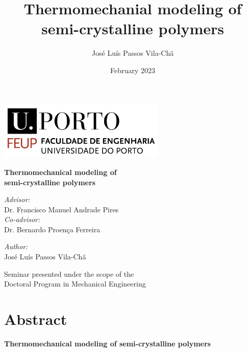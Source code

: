 \documentclass[a4paper, openright, twoside]{report}
\title{Thermomechanial modeling of semi-crystalline polymers}
\author{José Luís Passos Vila-Chã}
\date{February 2023}
\begin{document}
\begin{titlepage}
\thispagestyle{firststyle}
\begin{center}
   \begin{minipage}[c][10cm][l]{0.9\textwidth}

        \includegraphics[width=0.6\textwidth]{figures/university}

        \vspace{3.5cm}
        \huge
       \textbf{Thermomechanical modeling of}\\ \textbf{semi-crystalline polymers}

       \vspace{1.5cm}
        \small
       \textit{Advisor:}\\
       \normalsize
       Dr. Francisco Manuel Andrade Pires 	 	\\
       \small
       \textit{Co-advisor:}\\
       \normalsize
       Dr. Bernardo Proença Ferreira\\

       \vspace{0.3cm}


         \small
        \textit{Author:}\\
        \vspace{0.5cm}
       \normalsize
       \!José Luís Passos Vila-Chã
       \vspace{7.5cm}


        \centering
        \small
       Seminar presented under the scope of the\\ Doctoral Program in Mechanical Engineering

   \end{minipage}
   \end{center}
\end{titlepage}

\newpage\null\thispagestyle{blank}\newpage
\chapter*{Abstract}

\textbf{Thermomechanical modeling of semi-crystalline polymers}\\
\smallskip
\end{document}

